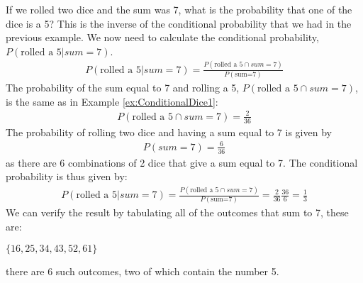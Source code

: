 \begin{example}{}{If we rolled two dice and the sum was 7, what is the probability that one of the dice is a 5?}{}
\label{ex:ConditionalDice2}
This is the inverse of the conditional probability that we had in the previous example. We now need to calculate the conditional probability, $P(\text{rolled a 5}|sum=7)$.
\begin{align}
P(\text{rolled a 5}|sum=7)=\frac{P( \text{rolled a 5} \cap sum=7)}{P(\text{sum=7})}
\end{align}
The probability of the sum equal to 7 and rolling a 5, $P( \text{rolled a 5} \cap sum=7)$, is the same as in Example \ref{ex:ConditionalDice1}:
\begin{align}
P( \text{rolled a 5} \cap sum=7)=\frac{2}{36}
\end{align}
The probability of rolling two dice and having a sum equal to 7 is given by
\begin{align}
P(sum=7)=\frac{6}{36}
\end{align}
as there are 6 combinations of 2 dice that give a sum equal to 7. The conditional probability is thus given by:
\begin{align}
P(\text{rolled a 5}|sum=7)=\frac{P( \text{rolled a 5} \cap sum=7)}{P(\text{sum=7})}=\frac{2}{36}\frac{36}{6}=\frac{1}{3}
\end{align}
We can verify the result by tabulating all of the outcomes that sum to 7, these are:

$\{16,25,34,43,52,61\}$
 
there are 6 such outcomes, two of which contain the number 5. 
\end{example}



